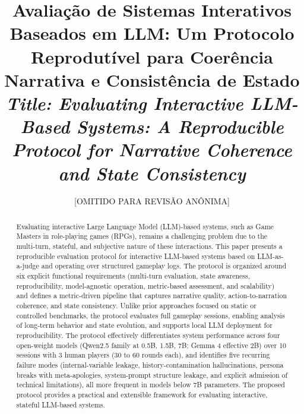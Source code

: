 \documentclass[12pt]{article}
\title{Avaliação de Sistemas Interativos Baseados em LLM: Um Protocolo Reprodutível para Coerência Narrativa e Consistência de Estado \\
\medskip
\small{
    \textit{Title: Evaluating Interactive LLM-Based Systems: A Reproducible Protocol for Narrative Coherence and State Consistency}
}
}
\author{[OMITIDO PARA REVISÃO ANÔNIMA]}
\begin{document}
\maketitle

\thispagestyle{plain}

\begin{abstract}
Evaluating interactive Large Language Model (LLM)-based systems, such as Game Masters in role-playing games (RPGs), remains a challenging problem due to the multi-turn, stateful, and subjective nature of these interactions. This paper presents a reproducible evaluation protocol for interactive LLM-based systems based on LLM-as-a-judge and operating over structured gameplay logs. The protocol is organized around six explicit functional requirements (multi-turn evaluation, state awareness, reproducibility, model-agnostic operation, metric-based assessment, and scalability) and defines a metric-driven pipeline that captures narrative quality, action-to-narration coherence, and state consistency. Unlike prior approaches focused on static or controlled benchmarks, the protocol evaluates full gameplay sessions, enabling analysis of long-term behavior and state evolution, and supports local LLM deployment for reproducibility. The protocol effectively differentiates system performance across four open-weight models (Qwen2.5 family at 0.5B, 1.5B, 7B; Gemma 4 effective 2B) over 10 sessions with 3 human players (30 to 60 rounds each), and identifies five recurring failure modes (internal-variable leakage, history-contamination hallucinations, persona breaks with meta-apologies, system-prompt structure leakage, and explicit admission of technical limitations), all more frequent in models below 7B parameters. The proposed protocol provides a practical and extensible framework for evaluating interactive, stateful LLM-based systems.
\end{abstract}

\end{document}
